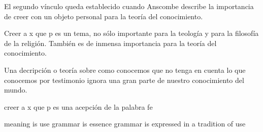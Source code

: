 El segundo vínculo queda establecido cuando Anscombe describe la importancia de
creer con un objeto personal para la teoría del conocimiento.

Creer a x que p es un tema, no sólo importante para la teología y para la
filosofía de la religión. También es de inmensa importancia para la teoría del
conocimiento.

Una decripción o teoría sobre como conocemos que no tenga en cuenta lo que
conocemos por testimonio ignora una gran parte de nuestro conocimiento del
mundo.

creer a x que p es una acepción de la palabra fe


meaning is use
grammar is essence
grammar is expressed in a tradition of use
